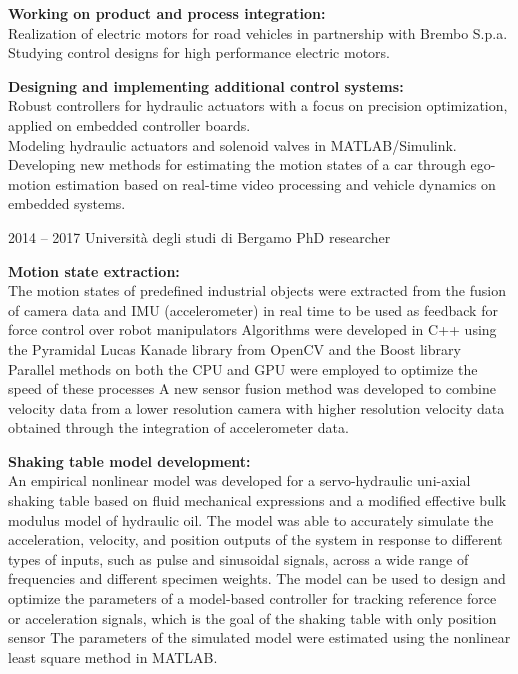 \documentclass[fontsize=12pt]{tccv}
\begin{document}
\begin{eventlist}
		\small \textbf{Working on product and process integration:}\\
		\small * Realization of electric motors for road vehicles in partnership with Brembo S.p.a.\\
		\small * Studying control designs for high performance electric motors.
		
		\small \textbf{Designing and implementing additional control systems:}\\
		\small * Robust controllers for hydraulic actuators with a focus on precision optimization, applied on embedded controller boards.\\
		\small * Modeling hydraulic actuators and solenoid valves in MATLAB/Simulink.\\
		\small * Developing new methods for estimating the motion states of a car through ego-motion estimation based on real-time video processing and vehicle dynamics on embedded systems.
		
		\item{2014 -- 2017}
		{Università degli studi di Bergamo}
		{PhD researcher}
		
		\small \textbf{Motion state extraction:}\\		
		The motion states of predefined industrial objects were extracted from the fusion of camera data and IMU (accelerometer) in real time to be used as feedback for force control over robot manipulators
		Algorithms were developed in C++ using the Pyramidal Lucas Kanade library from OpenCV and the Boost library
		Parallel methods on both the CPU and GPU were employed to optimize the speed of these processes
		A new sensor fusion method was developed to combine velocity data from a lower resolution camera with higher resolution velocity data obtained through the integration of accelerometer data.
		
		\small \textbf{Shaking table model development:}\\		
		An empirical nonlinear model was developed for a servo-hydraulic uni-axial shaking table based on fluid mechanical expressions and a modified effective bulk modulus model of hydraulic oil.
		The model was able to accurately simulate the acceleration, velocity, and position outputs of the system in response to different types of inputs, such as pulse and sinusoidal signals, across a wide range of frequencies and different specimen weights.
		The model can be used to design and optimize the parameters of a model-based controller for tracking reference force or acceleration signals, which is the goal of the shaking table with only position sensor
		The parameters of the simulated model were estimated using the nonlinear least square method in MATLAB.
		

\end{eventlist}
\end{document}
